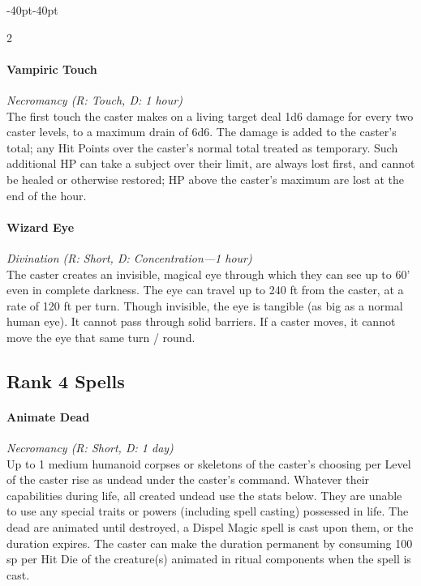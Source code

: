 \documentclass{book}
\begin{document}
\begin{adjustwidth}{-40pt}{-40pt}
\begin{multicols}{2}
\paragraph{Vampiric Touch}\label{vampiric-touch}

\emph{Necromancy (R: Touch, D: 1 hour)}\\
The first touch the caster makes on a living target deal 1d6 damage for
every two caster levels, to a maximum drain of 6d6. The damage is added
to the caster's total; any Hit Points over the caster's normal total
treated as temporary. Such additional HP can take a subject over their
limit, are always lost first, and cannot be healed or otherwise
restored; HP above the caster's maximum are lost at the end of the hour.

\paragraph{Wizard Eye}\label{wizard-eye}

\emph{Divination (R: Short, D: Concentration---1 hour)}\\
The caster creates an invisible, magical eye through which they can see
up to 60' even in complete darkness. The eye can travel up to 240 ft
from the caster, at a rate of 120 ft per turn. Though invisible, the eye
is tangible (as big as a normal human eye). It cannot pass through solid
barriers. If a caster moves, it cannot move the eye that same turn /
round.

\subsection*{Rank 4 Spells}\label{rank-4-spells}

\paragraph{Animate Dead}\label{animate-dead}

\emph{Necromancy (R: Short, D: 1 day)}\\
Up to 1 medium humanoid corpses or skeletons of the caster's choosing
per Level of the caster rise as undead under the caster's command.
Whatever their capabilities during life, all created undead use the
stats below. They are unable to use any special traits or powers
(including spell casting) possessed in life. The dead are animated until
destroyed, a Dispel Magic spell is cast upon them, or the duration
expires. The caster can make the duration permanent by consuming 100 sp
per Hit Die of the creature(s) animated in ritual components when the
spell is cast.


\end{multicols}
\end{adjustwidth}
\end{document}
